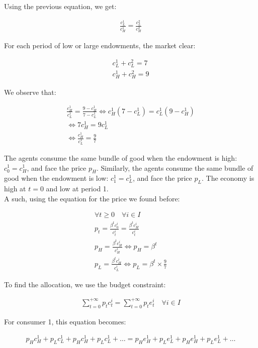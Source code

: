 \documentclass{article}
\begin{document}
Using the previous equation, we get:

\begin{gather*}
    \frac{c_L^1}{c_H^1}=\frac{c_L^2}{c_H^2}
\end{gather*}

For each period of low or large endowments, the market clear:

\begin{gather*}
    c_L^1+c_L^2=7\\
    c_H^1+c_H^2=9
\end{gather*}

We observe that:

\begin{gather*}
    \frac{c_H^1}{c_L^1}=\frac{9-c_H^1}{7-c_L^1}\Leftrightarrow c_H^1(7-c_L^1)=c_L^1(9-c_H^1)\\
    \Leftrightarrow 7c_H^1=9c_L^1\\
    \Leftrightarrow \frac{c_H^1}{c_L^1}=\frac{9}{7}
\end{gather*}

The agents consume the same bundle of good when the endowment is high: $c_0^1=c_H^1$, and face the price $p_H$. Similarly, the agents consume the same bundle of good when the endowment is low: $c_1^1=c_L^1$, and face the price $p_L$. The economy is high at $t=0$ and low at period 1.\\

A such, using the equation for the price we found before:

\begin{gather*}
    \forall t\geq0 \quad\forall i\in I\\
    p_t =\frac{\beta^t c_0^i}{c_t^i}=\frac{\beta^t c_H^i}{c_t^i}\\
    p_H =\frac{\beta^t c_H^i}{c_H^i}\Leftrightarrow p_H=\beta^t\\
    p_L=\frac{\beta^t c_H^i}{c_L^i}\Leftrightarrow p_L=\beta^t\times\frac{9}{7}
\end{gather*}

To find the allocation, we use the budget constraint:

\begin{gather*}
    \sum^{+\infty}_{t=0}p_tc_t^i=\sum^{+\infty}_{t=0}p_te_t^i \quad\forall i\in I
\end{gather*}

For consumer 1, this equation becomes:

\begin{gather*}
p_Hc_H^1+p_Lc_L^1+p_Hc_H^1+p_Lc_L^1+\hdots=p_He_H^1+p_Le_L^1+p_He_H^1+p_Le_L^1+\hdots\\
\end{gather*}
\end{document}
